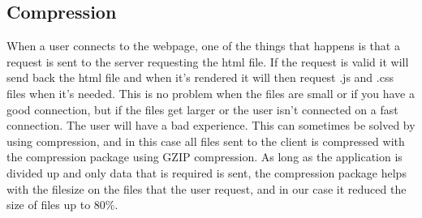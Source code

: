 \subsection{Compression}
When a user connects to the webpage, one of the things that happens is that a request is sent to the server requesting the html file. If the request is valid it will send back the html file and when it's rendered it will then request .js and .css files when it's needed. This is no problem when the files are small or if you have a good connection, but if the files get larger or the user isn't connected on a fast connection. The user will have a bad experience. This can sometimes be solved by using compression, and in this case all files sent to the client is compressed with the compression package using GZIP compression. As long as the application is divided up and only data that is required is sent, the compression package helps with the filesize on the files that the user request, and in our case it reduced the size of files up to 80\%.